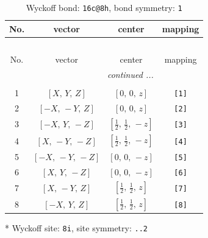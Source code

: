 \documentclass[fleqn,8pt]{jsarticle}
\begin{document}
\renewcommand{\arraystretch}{1.2}
\begin{longtable}{cccc}
\caption{Wyckoff bond: {\tt 16c@8h}, bond symmetry: {\tt 1}}
 \\
 \hline \hline
No. & vector & center & mapping \\ \hline \endfirsthead

\multicolumn{3}{l}{\tablename\ \thetable{}} \\
 \hline \hline
No. & vector & center & mapping \\ \hline \endhead

 \hline \hline
\multicolumn{3}{r}{\footnotesize\it continued ...} \\ \endfoot

 \hline \hline
\multicolumn{3}{r}{} \\ \endlastfoot

1 & $\left[ X,\, Y,\, Z \right]$ & $\left[ 0,\, 0,\, z \right]$ & {\tt [1]} \\ \hline
2 & $\left[ - X,\, - Y,\, Z \right]$ & $\left[ 0,\, 0,\, z \right]$ & {\tt [2]} \\ \hline
3 & $\left[ - X,\, Y,\, - Z \right]$ & $\left[ \frac{1}{2},\, \frac{1}{2},\, - z \right]$ & {\tt [3]} \\ \hline
4 & $\left[ X,\, - Y,\, - Z \right]$ & $\left[ \frac{1}{2},\, \frac{1}{2},\, - z \right]$ & {\tt [4]} \\ \hline
5 & $\left[ - X,\, - Y,\, - Z \right]$ & $\left[ 0,\, 0,\, - z \right]$ & {\tt [5]} \\ \hline
6 & $\left[ X,\, Y,\, - Z \right]$ & $\left[ 0,\, 0,\, - z \right]$ & {\tt [6]} \\ \hline
7 & $\left[ X,\, - Y,\, Z \right]$ & $\left[ \frac{1}{2},\, \frac{1}{2},\, z \right]$ & {\tt [7]} \\ \hline
8 & $\left[ - X,\, Y,\, Z \right]$ & $\left[ \frac{1}{2},\, \frac{1}{2},\, z \right]$ & {\tt [8]} \\
\end{longtable}
* Wyckoff site: {\tt 8i}, site symmetry: {\tt ..2}
\renewcommand{\arraystretch}{1.2}
\end{document}
